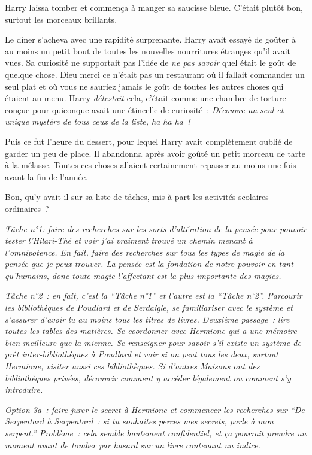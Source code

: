 Harry laissa tomber et commença à manger sa saucisse bleue.
C'était plutôt bon, surtout les morceaux brillants.

Le dîner s'acheva avec une rapidité surprenante.
Harry avait essayé de goûter à au moins un petit bout de toutes les nouvelles nourritures étranges qu'il avait vues.
Sa curiosité ne supportait pas l'idée de \emph{ne pas savoir} quel était le goût de quelque chose.
Dieu merci ce n'était pas un restaurant où il fallait commander un seul plat et où vous ne sauriez jamais le goût de toutes les autres choses qui étaient au menu.
Harry \emph{détestait} cela, c'était comme une chambre de torture conçue pour quiconque avait une étincelle de curiosité~: \emph{Découvre un seul et unique mystère de tous ceux de la liste, ha ha ha~!}

Puis ce fut l'heure du dessert, pour lequel Harry avait complètement oublié de garder un peu de place.
Il abandonna après avoir goûté un petit morceau de tarte à la mélasse.
Toutes ces choses allaient certainement repasser au moins une fois avant la fin de l'année.

Bon, qu'y avait-il sur sa liste de tâches, mis à part les activités scolaires ordinaires~?

\emph{Tâche n°1: faire des recherches sur les sorts d'altération de la pensée pour pouvoir tester l'Hilari-Thé et voir j'ai vraiment trouvé un chemin menant à l'omnipotence.
En fait, faire des recherches sur tous les types de magie de la pensée que je peux trouver.
La pensée est la fondation de notre pouvoir en tant qu'humains, donc toute magie l'affectant est la plus importante des magies.}

\emph{Tâche n°2~: en fait, c'est la “Tâche n°1” et l'autre est la “Tâche n°2”.
Parcourir les bibliothèques de Poudlard et de Serdaigle, se familiariser avec le système et s'assurer d'avoir lu au moins tous les titres de livres.
Deuxième passage~: lire toutes les tables des matières.
Se coordonner avec Hermione qui a une mémoire bien meilleure que la mienne.
Se renseigner pour savoir s'il existe un système de prêt inter-bibliothèques à Poudlard et voir si on peut tous les deux, surtout Hermione, visiter aussi ces bibliothèques.
Si d'autres Maisons ont des bibliothèques privées, découvrir comment y accéder légalement ou comment s'y introduire.}

\emph{Option 3a~: faire jurer le secret à Hermione et commencer les recherches sur “De Serpentard à Serpentard~: si tu souhaites perces mes secrets, parle à mon serpent.”
Problème~: cela semble hautement confidentiel, et ça pourrait prendre un moment avant de tomber par hasard sur un livre contenant un indice.}

